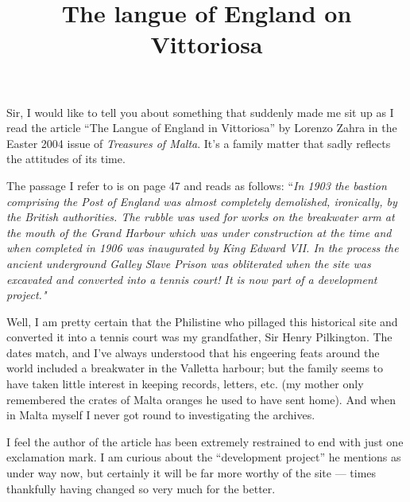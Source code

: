 \documentclass[a4paper,12pt]{article}
\begin{document}
\title{%
  The langue of England on Vittoriosa}

\author{}
\date{}
\maketitle
\thispagestyle{empty}
\parskip\parindent

Sir, I would like to tell you about something that suddenly made me
sit up as I read the article ``The Langue of England in Vittoriosa''
by Lorenzo Zahra in the Easter 2004 issue of \textit{Treasures of
  Malta}.  It's a family matter that sadly reflects the attitudes of
its time.

The passage I refer to is on page 47 and reads as follows:
``\textit{In 1903 the bastion comprising the Post of England was
  almost completely demolished, ironically, by the British
  authorities.  The rubble was used for works on the breakwater arm at
  the mouth of the Grand Harbour which was under construction at the
  time and when completed in 1906 was inaugurated by King Edward VII.
  In the process the ancient underground Galley Slave Prison was
  obliterated when the site was excavated and converted into a tennis
  court!  It is now part of a development project."}

Well, I am pretty certain that the Philistine who pillaged this
historical site and converted it into a tennis court was my
grandfather, Sir Henry Pilkington.  The dates match, and I've always
understood that his engeering feats around the world included a
breakwater in the Valletta harbour; but the family seems to have taken
little interest in keeping records, letters, etc. (my mother only
remembered the crates of Malta oranges he used to have sent home).
And when in Malta myself I never got round to investigating the
archives.

I feel the author of the article has been extremely restrained to end
with just one exclamation mark.  I am curious about the ``development
project'' he mentions as under way now, but certainly it will be far
more worthy of the site --- times thankfully having changed so very much
for the better.

\vskip1cm

\end{document}

